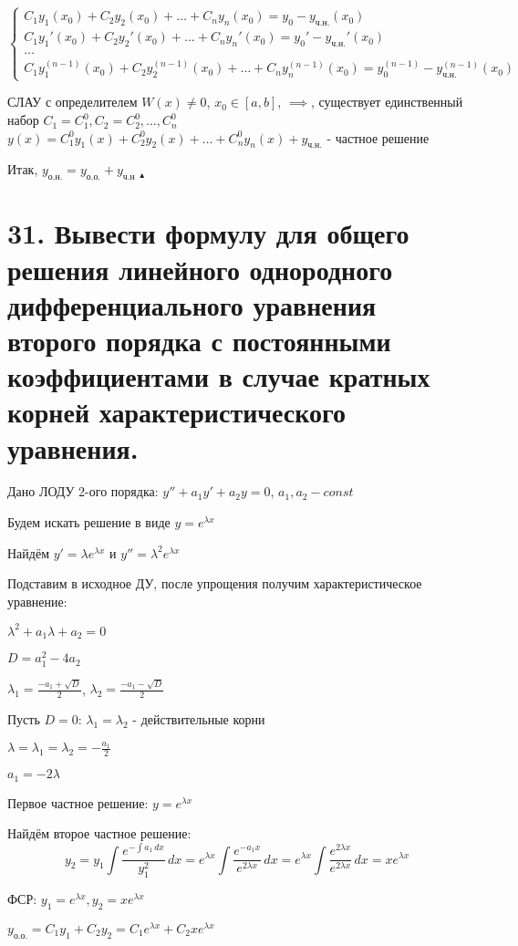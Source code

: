 \documentclass[11pt]{article}
\begin{document}
$$\left\{\begin{array}{l}
C_{1}y_{1}(x_{0}) + C_{2}y_{2}(x_{0}) + \dots + C_{n}y_{n}(x_{0}) = y_{0} - y_{\text{ч.н.}}(x_{0}) \\
C_{1}y_{1}'(x_{0}) + C_{2}y_{2}'(x_{0}) + \dots + C_{n}y_{n}'(x_{0}) = y_{0}' - y_{\text{ч.н.}}'(x_{0}) \\
\dots \\
C_{1}y_{1}^{(n-1)}(x_{0}) + C_{2}y_{2}^{(n-1)}(x_{0}) + \dots + C_{n}y_{n}^{(n-1)}(x_{0}) = y_{0}^{(n-1)} - y_{\text{ч.н.}}^{(n-1)}(x_{0})
\end{array}\right.$$
\par СЛАУ с определителем $W(x) \neq 0$, $x_{0} \in [a, b]$, $\implies$, существует единственный набор $C_{1} = C_{1}^0, C_{2} = C_{2}^0, \dots, C_{n}^0$
$y(x) = C_{1}^0y_{1}(x) + C_{2}^0y_{2}(x) + \dots + C_{n}^0y_{n}(x) + y_{\text{ч.н.}}$ - частное решение
\par Итак, $y_{\text{о.н.}} = y_{\text{о.о.}} + y_{\text{ч.н}}$ $_{\blacktriangle}$

\section*{31. Вывести формулу для общего решения линейного однородного дифференциального уравнения второго порядка с постоянными коэффициентами в случае кратных корней характеристического уравнения.}
\par Дано ЛОДУ 2-ого порядка: $y'' + a_{1}y' + a_{2}y = 0$, $a_{1}, a_{2} - const$
\par Будем искать решение в виде $y = e^{\lambda x}$
\par Найдём $y' = \lambda e^{\lambda x}$ и $y'' = \lambda^2 e^{\lambda x}$
\par Подставим в исходное ДУ, после упрощения получим характеристическое уравнение:
\par $\lambda^2 + a_{1} \lambda + a_{2} = 0$
\par $D = a_{1}^2 - 4a_{2}$
\par $\lambda_{1} = \frac{-a_{1} + \sqrt{ D }}{2}$, $\lambda_{2} = \frac{-a_{1} - \sqrt{ D }}{2}$
\par Пусть $D = 0$: $\lambda_{1} = \lambda_{2}$ - действительные корни
\par $\lambda = \lambda_{1} = \lambda_{2} = -\frac{a_{1}}{2}$
\par $a_{1} = -2 \lambda$
\par Первое частное решение: $y = e^{\lambda x}$
\par Найдём второе частное решение:
$$y_{2} = y_{1} \int \frac{e^{-\int a_{1} \, dx}}{y_{1}^2} \, dx = e^{\lambda x} \int \frac{e^{- a_{1} x}}{e^{2\lambda x}} \, dx = e^{\lambda x} \int \frac{e^{2\lambda x}}{e^{2\lambda x}} \, dx = x e^{\lambda x}$$
\par ФСР: $y_{1} = e^{\lambda x}, y_{2} = x e^{\lambda x}$
\par $y_{\text{о.о.}} = C_{1}y_{1} + C_{2}y_{2} = C_{1} e^{\lambda x} + C_{2} x e^{\lambda x}$
\end{document}
